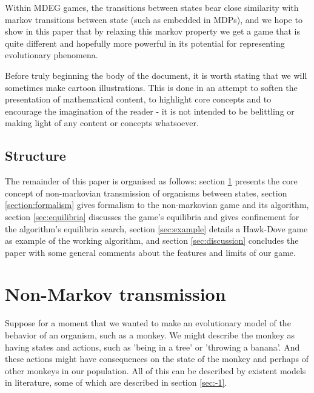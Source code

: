 Within MDEG games, the transitions between states bear close similarity with markov transitions between state (such as embedded in MDPs), and we hope to show in this paper that by relaxing this markov property we get a game that is quite different and hopefully more powerful in its potential for representing evolutionary phenomena.

Before truly beginning the body of the document, it is worth stating that we will sometimes make cartoon illustrations.
This is done in an attempt to soften the presentation of mathematical content, to highlight core concepts and to encourage the imagination of the reader - it is not intended to be belittling or making light of any content or concepts whatsoever.

\subsection{Structure}
The remainder of this paper is organised as follows: section \ref{sec:2} presents the core concept of non-markovian transmission of organisms between states, section \ref{section:formalism} gives formalism to the non-markovian game and its algorithm, section \ref{sec:equilibria} discusses the game's equilibria and gives confinement for the algorithm's equilibria search, section \ref{sec:example} details a Hawk-Dove game as example of the working algorithm, and section \ref{sec:discussion} concludes the paper with some general comments about the features and limits of our game.

\section{Non-Markov transmission}\label{sec:2}

Suppose for a moment that we wanted to make an evolutionary model of the behavior of an organism, such as a monkey.
We might describe the monkey as having states and actions, such as 'being in a tree' or 'throwing a banana'.
And these actions might have consequences on the state of the monkey and perhaps of other monkeys in our population.
All of this can be described by existent models in literature, some of which are described in section \ref{sec:-1}.

